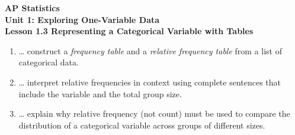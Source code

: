 \documentclass[10pt]{article}
\begin{document}
\vspace{-0.8in}

\begin{center}
  {\color{white}\textbf{\LARGE AP Statistics}}\\[4pt]
  {\color{skymid}\large\textbf{Unit 1: Exploring One-Variable Data}}\\[6pt]
  {\color{white}\textbf{\large Lesson 1.3 \quad Representing a Categorical Variable with Tables}}
\end{center}

\vspace{0.22in}

\namedateperiod

\vspace{0.18in}

\begin{learningtargetbox}
\small
\begin{enumerate}[leftmargin=1.5em, itemsep=5pt]
  \item \ldots{} construct a \textit{frequency table} and a
        \textit{relative frequency table} from a list of categorical data.
  \item \ldots{} interpret relative frequencies in context using complete sentences
        that include the variable and the total group size.
  \item \ldots{} explain why relative frequency (not count) must be used to compare
        the distribution of a categorical variable across groups of different sizes.
\end{enumerate}
\end{learningtargetbox}

\vspace{0.14in}
\end{document}
